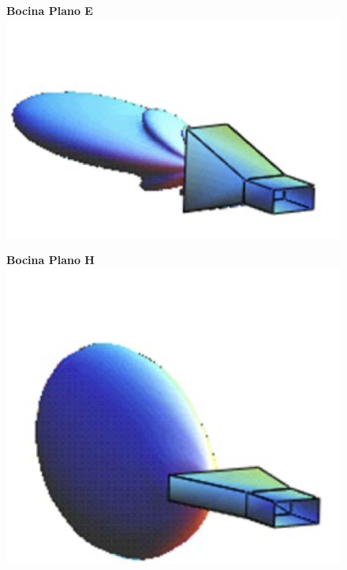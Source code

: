 \documentclass[twocolumn, 8pt]{extarticle}
\begin{document}
\begin{multicols}{2}
	\begin{figure}[H]
		\centering
		\textbf{Bocina Plano E}
		\includegraphics[width=\columnwidth]{bocina_e.png}
	\end{figure}

	\begin{figure}[H]
		\centering
		\textbf{Bocina Plano H}
		\includegraphics[width=\columnwidth]{bocina_h.png}
	\end{figure}
\end{multicols}
\end{document}
